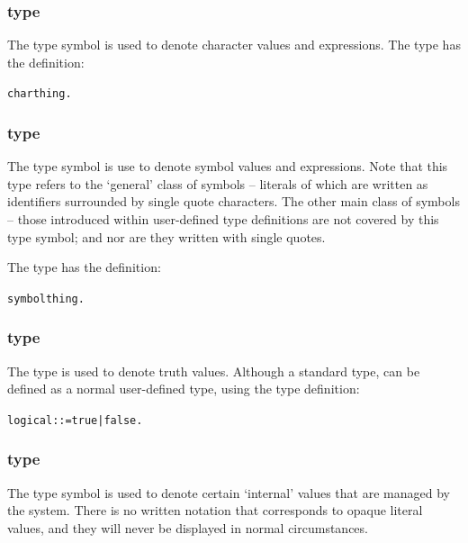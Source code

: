 \subsubsection{ type}
\label{types:standard:char}

The  type symbol is used to denote character values and expressions. The  type has the definition:
\begin{alltt}
char \impl thing.
\end{alltt}

\subsubsection{ type}
\label{types:standard:symbol}

The  type symbol is use to denote symbol values and expressions. Note that this type refers to the `general' class of symbols -- literals of which are written as identifiers surrounded by single quote characters. The other main class of symbols -- those introduced within user-defined type definitions are not covered by this type symbol; and nor are they written with single quotes.

The  type has the definition:
\begin{alltt}
symbol \impl thing.
\end{alltt}


\subsubsection{ type}
\label{types:standard:logical}

The  type is used to denote truth values. Although a standard type,  can be defined as a normal user-defined type, using the type definition:
\begin{alltt}
logical ::= true | false.
\end{alltt}

\subsubsection{ type}
\label{types:standard:opaque}
The  type symbol is used to denote certain `internal' values that are managed by the \go system. There is no written notation that corresponds to opaque literal values, and they will never be displayed in normal circumstances.

